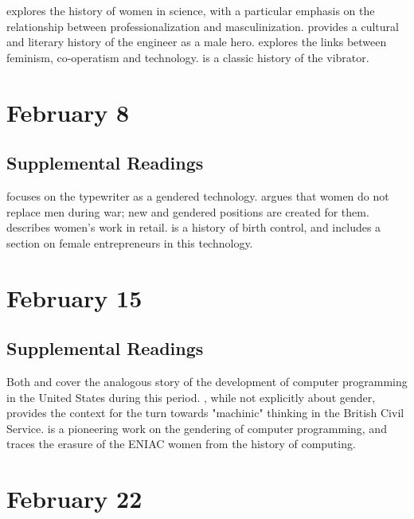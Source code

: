 \documentclass[11pt]{article}
\begin{document}
\cite{Rossiter:1982vn} explores the history of women in science, with a particular emphasis on the relationship between professionalization and masculinization.   \cite{Tichi:1987wb} provides a cultural and literary history of the engineer as a male hero. \cite{Hacker:1989tm} explores the links between feminism, co-operatism and technology.  \cite{Maines:1999uw} is a classic history of the vibrator.

\section{February 8}
\label{sec:org0a39bfb}


\subsection{Supplemental Readings}
\label{sec:org0efad31}

\cite{Davies:1982vb} focuses on the typewriter as a gendered technology.
\cite{Milkman:1987tl} argues that women do not replace men during war;
new and gendered positions are created for them. \cite{Benson:1987wl}
describes women's work in retail. \cite{Tone:2001to} is a history of
birth control, and includes a section on female entrepreneurs in this
technology.

\section{February 15}
\label{sec:orgea8f63f}


\subsection{Supplemental Readings}
\label{sec:orgd85fb26}

Both \cite{Ensmenger:2010te} and \cite{Abbate:2012wq} cover the
analogous story of the development of computer programming in the United
States during this period. \cite{Agar:2003wf}, while not explicitly
about gender, provides the context for the turn towards "machinic"
thinking in the British Civil Service. \cite{Edwards:1990ua} is a pioneering work on the gendering of computer programming, and \cite{Light:1999wg} traces the erasure of the ENIAC women from the history of computing.


\section{February 22}
\label{sec:org7301251}
\end{document}
